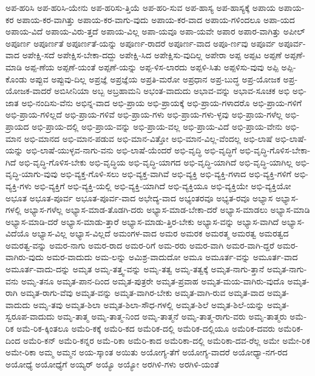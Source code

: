 {ಅಪ-ಹರಿಸಿ
ಅಪ-ಹರಿಸಿ-ಯೇನು
ಅಪ-ಹರಿಸು-ತ್ತಿಯೆ
ಅಪ-ಹರಿ-ಸುವ
ಅಪ-ಹಾಸ್ಯ
ಅಪ-ಹಾಸ್ಯಕ್ಕೆ
ಅಪಾಯ
ಅಪಾಯ-ಕರ
ಅಪಾಯ-ಕರ-ವಾಗಿತ್ತು
ಅಪಾಯ-ಕರ-ವಾಗು-ವುದು
ಅಪಾಯ-ಕರ-ವಾದ
ಅಪಾಯ-ಗಳಿಂದಲೂ
ಅಪಾ-ಯದ
ಅಪಾಯ-ವಿದೆ
ಅಪಾಯ-ವಿರು-ತ್ತದೆ
ಅಪಾಯ-ವಿಲ್ಲ
ಅಪಾ-ಯವೂ
ಅಪಾ-ಯವೇ
ಅಪಾರ
ಅಪಾರ-ವಾಗಿತ್ತು
ಅಪೀಲ್
ಅಪೂರ್ಣ
ಅಪೂರ್ಣತೆ
ಅಪೂರ್ಣತೆ-ಯನ್ನು
ಅಪೂರ್ಣ-ರಾದರೆ
ಅಪೂರ್ಣ-ವಾದ
ಅಪೂ-ರ್ಣವು
ಅಪೂರ್ವ
ಅಪೂರ್ವ-ವಾದ
ಅಪೇಕ್ಷಿ-ಸದೆ
ಅಪೇಕ್ಷಿಸ-ಬೇಕಾ-ದದ್ದು
ಅಪೇಕ್ಷಿ-ಸಿದ
ಅಪೇಕ್ಷಿಸು-ವುದಿಲ್ಲ
ಅಪೇರಾ
ಅಪ್ಪ
ಅಪ್ಪಟ
ಅಪ್ಪಣೆ
ಅಪ್ಪಣೆ-ಮಾಡಿ
ಅಪ್ಪ-ಣೆಯ
ಅಪ್ಪಣೆ-ಯಂತೆ
ಅಪ್ಪಣೆ-ಯನ್ನು
ಅಪ್ಪ-ಳಿಸ-ಲಾರದು
ಅಪ್ಪಳಿ-ಸಿತು
ಅಪ್ಪಳಿಸು-ವುವು
ಅಪ್ಪಿ
ಅಪ್ಪಿ-ಕೊಂಡು
ಅಪ್ಪುವ
ಅಪ್ಪುವು-ದಿಲ್ಲ
ಅಪ್ರಜ್ಞೆ
ಅಪ್ರಜ್ಞೆಯ
ಅಪ್ರತಿ-ಮರೋ
ಅಪ್ರಧಾನ
ಅಪ್ರ-ಬುದ್ಧ
ಅಪ್ರ-ಯೋಜಕ
ಅಪ್ರ-ಯೋಜಕ-ವಾದರೆ
ಅಬಿಸೀನಿಯಾ
ಅಬ್ಬ
ಅಬ್ರಹಾಮನಿ
ಅಭಂತ-ವಾದುದು
ಅಭಾವ-ವನ್ನು
ಅಭಾವ-ಸೂಚಕ
ಅಭಿ
ಅಭಿ-ಜಾತ
ಅಭಿ-ನಂದಿಸು-ವೆನು
ಅಭಿನ್ನ-ವಾದ
ಅಭಿ-ಪ್ರಾಯ
ಅಭಿ-ಪ್ರಾಯಕ್ಕೆ
ಅಭಿ-ಪ್ರಾಯ-ಗಳಾದರೊ
ಅಭಿ-ಪ್ರಾಯ-ಗಳಿಗೆ
ಅಭಿ-ಪ್ರಾಯ-ಗಳಿಲ್ಲದೆ
ಅಭಿ-ಪ್ರಾಯ-ಗಳಿವೆ
ಅಭಿ-ಪ್ರಾಯ-ಗಳು
ಅಭಿ-ಪ್ರಾಯ-ಗಳು-ಳ್ಳವು
ಅಭಿ-ಪ್ರಾಯ-ಗಳೆಲ್ಲ
ಅಭಿ-ಪ್ರಾಯದ
ಅಭಿ-ಪ್ರಾಯ-ದಲ್ಲಿ
ಅಭಿ-ಪ್ರಾಯ-ವನ್ನು
ಅಭಿ-ಪ್ರಾಯ-ವಲ್ಲ
ಅಭಿ-ಪ್ರಾಯ-ವಿದೆ
ಅಭಿ-ಪ್ರಾಯ-ವೇನು
ಅಭಿ-ಮಾನ
ಅಭಿ-ಮಾನದ
ಅಭಿ-ಮಾನ-ಪಡುವ
ಅಭಿ-ಮಾನ-ವಿತ್ತೋ
ಅಭಿ-ಮಾನ-ವಿಲ್ಲ-ವೆಂದಲ್ಲ
ಅಭಿ-ಲಾಷೆ
ಅಭಿ-ಲಾಷೆ-ಯನ್ನು
ಅಭಿ-ಲಾಷೆ-ಯುಳ್ಳವ-ನಾಗು-ವನು
ಅಭಿ-ಲಾಷೆ-ಯೆಂದರೆ
ಅಭಿ-ವೃದ್ಧಿ
ಅಭಿ-ವೃದ್ಧಿಗೆ
ಅಭಿ-ವೃದ್ಧಿ-ಗೊಳಿಸ-ಬೇಕಾ-ಗಿದೆ
ಅಭಿ-ವೃದ್ಧಿ-ಗೊಳಿಸ-ಬೇಕು
ಅಭಿ-ವೃದ್ಧಿಯ
ಅಭಿ-ವೃದ್ಧಿ-ಯಾಗದ
ಅಭಿ-ವೃದ್ಧಿ-ಯಾಗಿದೆ
ಅಭಿ-ವೃದ್ಧಿ-ಯಾಗಿಲ್ಲ
ಅಭಿ-ವೃದ್ಧಿ-ಯಾಗು-ವುವು
ಅಭಿ-ವ್ಯಕ್ತ-ಗೊಳಿ-ಸಲು
ಅಭಿ-ವ್ಯಕ್ತ-ವಾಗಿವೆ
ಅಭಿ-ವ್ಯಕ್ತಿ
ಅಭಿ-ವ್ಯಕ್ತಿ-ಗಳಾದ
ಅಭಿ-ವ್ಯಕ್ತಿ-ಗಳಿಗೆ
ಅಭಿ-ವ್ಯಕ್ತಿ-ಗಳು
ಅಭಿ-ವ್ಯಕ್ತಿಗೆ
ಅಭಿ-ವ್ಯಕ್ತಿ-ಯಲ್ಲಿ
ಅಭಿ-ವ್ಯಕ್ತಿ-ಯಾಗಿದೆ
ಅಭಿ-ವ್ಯಕ್ತಿಯೂ
ಅಭಿ-ವ್ಯಕ್ತಿಯೇ
ಅಭಿ-ವ್ಯಕ್ತಿಯೋ
ಅಭೂತ
ಅಭೂತ-ಪೂರ್ವ
ಅಭೂತ-ಪೂರ್ವ-ವಾದ
ಅಭೇದ್ಯ-ವಾದ
ಅಭ್ಯಂತರವೂ
ಅಭ್ಯತ-ರವೂ
ಅಭ್ಯಾಸ
ಅಭ್ಯಾಸ-ಗಳಲ್ಲಿ
ಅಭ್ಯಾಸ-ಗಳೆಲ್ಲ
ಅಭ್ಯಾಸ-ಮಾಡ-ತೊಡಗಿ-ದರು
ಅಭ್ಯಾಸ-ಮಾಡ-ಬೇಕಾ-ದರೆ
ಅಭ್ಯಾಸ-ಮಾಡಲು
ಅಭ್ಯಾಸ-ಮಾಡಿ
ಅಭ್ಯಾಸ-ಮಾಡಿ-ದರೆ
ಅಭ್ಯಾಸ-ಮಾಡು-ತ್ತಾರೆ
ಅಭ್ಯಾಸ-ಮಾಡು-ತ್ತಿರ-ಬೇಕು
ಅಭ್ಯಾಸ-ವನ್ನು
ಅಭ್ಯಾಸ-ವಾಗಿದೆ
ಅಭ್ಯಾಸ-ವಿದೆಯೊ
ಅಭ್ಯಾಸ-ವಿಲ್ಲ
ಅಭ್ಯಾಸ-ವಿಲ್ಲದೆ
ಅಮಂಗಳ-ವಾದ
ಅಮರ
ಅಮರಕ
ಅಮರತ್ಮ
ಅಮರತ್ವ
ಅಮರತ್ವದ
ಅಮರತ್ವ-ವನ್ನು
ಅಮರ-ನಾಗು
ಅಮರ-ರಾದ
ಅಮರ-ರಿಗೆ
ಅಮ-ರರು
ಅಮರ-ವಾಗಿ
ಅಮರ-ವಾಗಿ-ದ್ದರೆ
ಅಮರ-ವಾಗಿರು-ವುದು
ಅಮರ-ವಾದುದು
ಅಮ-ಲನ್ನು
ಅಮಿಶ್ರ-ವಾದುದೋ
ಅಮೂ
ಅಮೂರ್ತ-ವನ್ನು
ಅಮೂರ್ತ-ವಾದ
ಅಮೂರ್ತ-ವಾದು-ದನ್ನು
ಅಮೃತ
ಅಮೃ-ತತ್ತ್ವ-ವನ್ನು
ಅಮೃ-ತತ್ವ
ಅಮೃ-ತತ್ವಕ್ಕೆ
ಅಮೃತ-ನಾಗು-ತ್ತಾನೆ
ಅಮೃತ-ನಾಗು-ವನು
ಅಮೃ-ತನೂ
ಅಮೃತ-ಪಾನ-ದಿಂದ
ಅಮೃತ-ಪುತ್ರರೇ
ಅಮೃತ-ಪ್ರವಾಹ
ಅಮೃತ-ಮಯ-ವಾಗಿರು-ವುದೊ
ಅಮೃತ-ರಾಗಿ
ಅಮೃತ-ರಾಗು-ವೆವು
ಅಮೃತ-ವನ್ನು
ಅಮೃತ-ವಾಗಿರ-ಬೇಕು
ಅಮೃತ-ವಾಗಿ-ರುವ
ಅಮೃತ-ವಾದ
ಅಮೃತ-ವಾದುದು
ಅಮೃ-ತವು
ಅಮೃತ-ಶಿಲಾ
ಅಮೃತ-ಶಿಲಾ-ಸೌಧ-ಗಳಲ್ಲಿ
ಅಮೃತ-ಶಿಲೆ
ಅಮೃತ-ಶಿಲೆ-ಯನ್ನು
ಅಮೃತ-ಸ್ವರೂಪ-ವಾದುದು
ಅಮೃ-ತಾತ್ಮ
ಅಮೃ-ತಾತ್ಮ-ನಿಂದ
ಅಮೃ-ತಾತ್ಮನೆ
ಅಮೃ-ತಾತ್ಮ-ರಾಗು-ವರು
ಅಮೃ-ತಾತ್ಮರು
ಅಮೆ-ರಿಕ
ಅಮೆ-ರಿಕ-ಕ್ಕಿಂತಲೂ
ಅಮೆರಿ-ಕಕ್ಕೆ
ಅಮೆರಿ-ಕದ
ಅಮೆರಿಕ-ದಲ್ಲಿ
ಅಮೆರಿಕ-ದಲ್ಲಿಯೂ
ಅಮೆರಿಕ-ದವರು
ಅಮೆರಿಕ-ದಿಂದ
ಅಮೆರಿ-ಕನ್
ಅಮೆರಿ-ಕನ್ನರ
ಅಮೆ-ರಿಕಾ
ಅಮೆರಿ-ಕಾದ
ಅಮೆರಿಕಾ-ದಲ್ಲಿ
ಅಮೆರಿಕಾ-ದವ-ರೆಲ್ಲ
ಅಮೇ
ಅಮೇ-ರಿಕ
ಅಮೇ-ರಿಕಾ
ಅಮ್ಮ
ಅಮ್ಮನ
ಅಯ-ಸ್ಕಾಂತ
ಅಯಿತು
ಅಯೋಗ್ಯ-ತೆಗೆ
ಅಯೋಗ್ಯ-ವಾದರೆ
ಅಯೋಧ್ಯಾ-ನಗ-ರದ
ಅಯೋಧ್ಯೆ
ಅಯೋಧ್ಯೆಗೆ
ಅಯ್ಯರ್
ಅಯ್ಯೊ
ಅಯ್ಯೋ
ಅರಗಿಳಿ-ಗಳು
ಅರಗಿಳಿ-ಯಂತೆ
}
